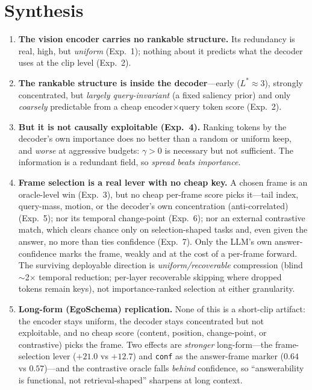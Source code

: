 \documentclass[11pt]{article}
\newcommand{\gm}{\gamma}
\begin{document}
\section{Synthesis}
\begin{enumerate}
\item \textbf{The vision encoder carries no rankable structure.} Its redundancy is real, high, but
      \emph{uniform} (Exp.~1); nothing about it predicts what the decoder uses at the clip level (Exp.~2).
\item \textbf{The rankable structure is inside the decoder}---early ($L^{\!*}{\approx}3$), strongly
      concentrated, but \emph{largely query-invariant} (a fixed saliency prior) and only
      \emph{coarsely} predictable from a cheap encoder$\times$query token score (Exp.~2).
\item \textbf{But it is not causally exploitable (Exp.~4).} Ranking tokens by the decoder's own
      importance does no better than a random or uniform keep, and \emph{worse} at aggressive
      budgets: $\gm{>}0$ is necessary but not sufficient. The information is a redundant field, so
      \emph{spread beats importance}.
\item \textbf{Frame selection is a real lever with no cheap key.} A chosen frame is an oracle-level
      win (Exp.~3), but no cheap per-frame score picks it---tail index, query-mass, motion, or the
      decoder's own concentration (anti-correlated) (Exp.~5); nor its temporal change-point (Exp.~6);
      nor an external contrastive match, which clears chance only on selection-shaped tasks and, even
      given the answer, no more than ties confidence (Exp.~7). Only the LLM's own answer-confidence
      marks the frame, weakly and at the cost of a per-frame forward. The surviving deployable
      direction is \emph{uniform/recoverable} compression (blind $\sim$2$\times$ temporal reduction;
      per-layer recoverable skipping where dropped tokens remain keys), not importance-ranked
      selection at either granularity.
\item \textbf{Long-form (EgoSchema) replication.} None of this is a short-clip artifact: the encoder
      stays uniform, the decoder stays concentrated but not exploitable, and no cheap score (content,
      position, change-point, or contrastive) picks the frame. Two effects are \emph{stronger}
      long-form---the frame-selection lever ($+21.0$ vs $+12.7$) and \texttt{conf} as the answer-frame
      marker ($0.64$ vs $0.57$)---and the contrastive oracle falls \emph{behind} confidence, so
      ``answerability is functional, not retrieval-shaped'' sharpens at long context.
\end{enumerate}
\end{document}
